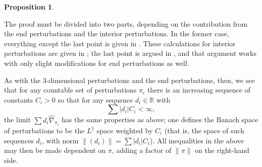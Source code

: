 \documentclass{memo-l}
\newtheorem{proposition}[theorem]{Proposition}
\theoremstyle{definition}
\theoremstyle{remark}
\numberwithin{section}{chapter}
\numberwithin{equation}{chapter}
\begin{document}
\begin{proposition}
\begin{enumerate}
\end{enumerate}
\end{proposition}

The proof must be divided into two parts, depending on the contribution from the end perturbations and the interior perturbations. In the former case, everything except the last point is given in \cite[Proposition~3.7]{KM1}. These calculations for interior perturbations are given in \cite[Section 3]{Kronheimer}; the last point is argued in \cite[Lemma~3.4]{Kronheimer}, and that argument works with only slight modifications for end perturbations as well.

As with the 3-dimensional perturbations and the end perturbations, then, we see that for any countable set of perturbations $\pi_i$ there is an increasing sequence of constants $C_i > 0$ so that for any sequence $d_i \in \mathbb R$ with $$\sum |d_i| C_i < \infty,$$ the limit $\sum d_i \widehat{\nabla}_{\pi_i}$ has the same properties as above; one defines the Banach space of perturbations to be the $L^1$ space weighted by $C_i$ (that is, the space of such sequences $d_i$, with norm $\|(d_i)\| = \sum |d_i| C_i$). All inequalities in the above may then be made dependent on $\pi$, adding a factor of $\|\pi\|$ on the right-hand side. 
\end{document}
